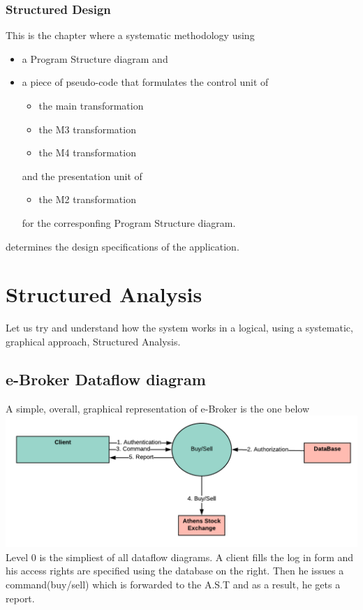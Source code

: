 \documentclass{article}
\begin{document}
\subsubsection{Structured Design}
This is the chapter where a systematic methodology using
\begin{itemize}
\item a Program Structure diagram and 
\item a piece of pseudo-code that formulates the control unit of
\begin{itemize}[{label=$\circ$}]
\item the main transformation 
\item the M3 transformation 
\item the M4 transformation
\end{itemize}
and the presentation unit of
\begin{itemize}[{label=$\circ$}]
\item the M2 transformation 
\end{itemize}
for the corresponfing Program Structure diagram.
\end{itemize}
determines the design specifications of the application. 

\newpage
\section{Structured Analysis}
Let us try and understand how the system works in a logical, using a systematic, graphical approach, Structured Analysis. 

\subsection{e-Broker Dataflow diagram}
A simple, overall, graphical representation of e-Broker is the one below\\
\hspace*{5mm}\includegraphics[scale=0.8]{dataflow_0.png}\\
Level 0 is the simpliest of all dataflow diagrams. A client fills the log in form and his access rights are specified
using the database on the right. Then he issues a command(buy/sell)
which is forwarded to the A.S.T and as a result, he gets a report.
\end{document}
